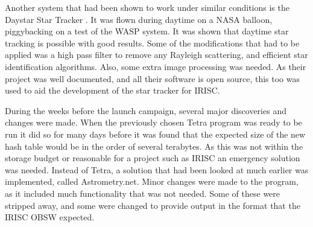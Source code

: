 Another system that had been shown to work under similar conditions is the Daystar Star Tracker \cite{daystar}. It was flown during daytime on a NASA balloon, piggybacking on a test of the WASP system. It was shown that daytime star tracking is possible with good results. Some of the modifications that had to be applied was a high pass filter to remove any Rayleigh scattering, and efficient star identification algorithms. Also, some extra image processing was needed. As their project was well documented, and all their software is open source, this too was used to aid the development of the star tracker for IRISC.

During the weeks before the launch campaign, several major discoveries and changes were made. When the previously chosen Tetra program was ready to be run it did so for many days before it was found that the expected size of the new hash table would be in the order of several terabytes. As this was not within the storage budget or reasonable for a project such as IRISC an emergency solution was needed. Instead of Tetra, a solution that had been looked at much earlier was implemented, called Astrometry.net. Minor changes were made to the program, as it included much functionality that was not needed. Some of these were stripped away, and some were changed to provide output in the format that the IRISC OBSW expected.



\raggedbottom
